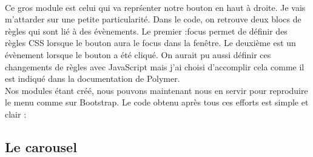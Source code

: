 \documentclass{article}
\begin{document}
\vspace{0.5cm}\\
Ce gros module est celui qui va repr\'senter notre bouton en haut \`a droite. Je vais m'attarder sur une petite particularit\'e. Dans le code, on retrouve deux blocs de r\`egles qui sont li\'e \`a des \'ev\`enements. Le premier \og :focus \fg{} permet de d\'efinir des r\`egles CSS lorsque le bouton aura le focus dans la fen\^etre. Le deuxi\`eme est un \'ev\`enement lorsque le bouton a \'et\'e cliqu\'e. On aurait pu aussi d\'efinir ces changements de r\`egles avec JavaScript mais j'ai choisi d'accomplir cela comme il est indiqu\'e dans la documentation de Polymer. 
\vspace{0.5cm}\\
Nos modules \'etant cr\'e\'e, nous pouvons maintenant nous en servir pour reproduire le menu comme sur Bootstrap. Le code obtenu apr\`es tous ces efforts est simple et clair :
\vspace{0.5cm}\\
\subsection{Le carousel}
\end{document}
